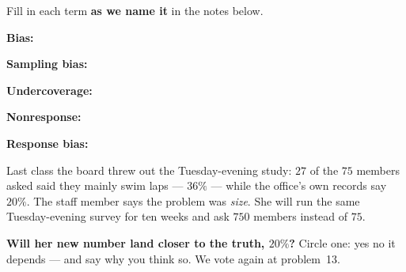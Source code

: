 \documentclass[12pt]{article}
\newcommand{\termrowheight}{2.3cm}
\newlength{\termrowinset}\setlength{\termrowinset}{7pt}
\newcommand{\vterm}[1]{%
  \par\noindent\begin{minipage}[t][\termrowheight][t]{\linewidth}%
    \vspace*{\termrowinset}%
    \textbf{\textcolor{cerulean}{#1:}}%
  \end{minipage}\par}
\begin{document}

\vspace{0.15in}

\begin{vocabbox}
\small
Fill in each term \textbf{as we name it} in the notes below.
\vterm{Bias}
\vterm{Sampling bias}
\vterm{Undercoverage}
\vterm{Nonresponse}
\vterm{Response bias}
\end{vocabbox}

\boxguard[12]
\begin{hookbox}
\small
Last class the board threw out the Tuesday-evening study: $27$ of the $75$ members asked said
they mainly swim laps --- $36\%$ --- while the office's own records say $20\%$. The staff
member says the problem was \emph{size}. She will run the same Tuesday-evening survey for
ten weeks and ask $750$ members instead of $75$.

\vspace{3pt}
\textbf{Will her new number land closer to the truth, $20\%$?} Circle one: \quad yes \qquad
no \qquad it depends \quad --- and say why you think so. We vote again at problem~13.
\par{}
\end{hookbox}
\end{document}
